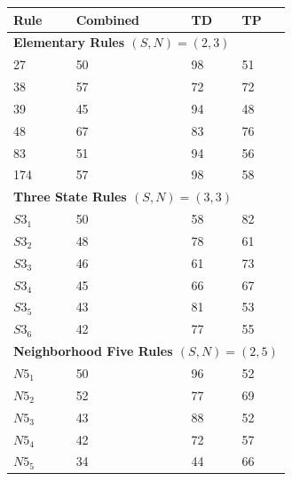 \documentclass{elsarticle}
\begin{document}
\begin{multicols}{2}
	
	\begin{table}[H] \centering
		\small
		\begin{tabular}{|l|l|l|l|}
			\hline
			\textbf{Rule}  & \textbf{Combined} & \textbf{TD} & \textbf{TP} \\ \hline
			\multicolumn{4}{|l|}{\textbf{Elementary Rules \boldmath$(S,N) = (2,3)$}} \\ 
			\hline
			27             & 50                & 98          & 51          \\ \hline
			38             & 57                & 72          & 72          \\ \hline
			39             & 45                & 94          & 48          \\ \hline
			48             & 67                & 83          & 76          \\ \hline
			83             & 51                & 94          & 56          \\ \hline
			174            & 57                & 98          & 58          \\ \hline
			\multicolumn{4}{|l|}{\textbf{Three State Rules \boldmath$(S,N) = (3,3)$}} \\ 
			\hline
			$S3_{1}$       & 50                & 58          & 82          \\ \hline
			$S3_{2}$       & 48                & 78          & 61          \\ \hline
			$S3_{3}$       & 46                & 61          & 73          \\ \hline
			$S3_{4}$       & 45                & 66          & 67          \\ \hline
			$S3_{5}$       & 43                & 81          & 53          \\ \hline
			$S3_{6}$       & 42                & 77          & 55          \\ \hline
			\multicolumn{4}{|l|}{\textbf{Neighborhood Five Rules \boldmath$(S,N) = (2,5)$}} 
			\\ \hline
			$N5_{1}$       & 50                & 96          & 52          \\ \hline
			$N5_{2}$       & 52                & 77          & 69          \\ \hline
			$N5_{3}$       & 43                & 88          & 52          \\ \hline
			$N5_{4}$       & 42                & 72          & 57          \\ \hline
			$N5_{5}$       & 34                & 44          & 66          \\  \hline

\end{tabular}
\end{table}
\end{multicols}
\end{document}

